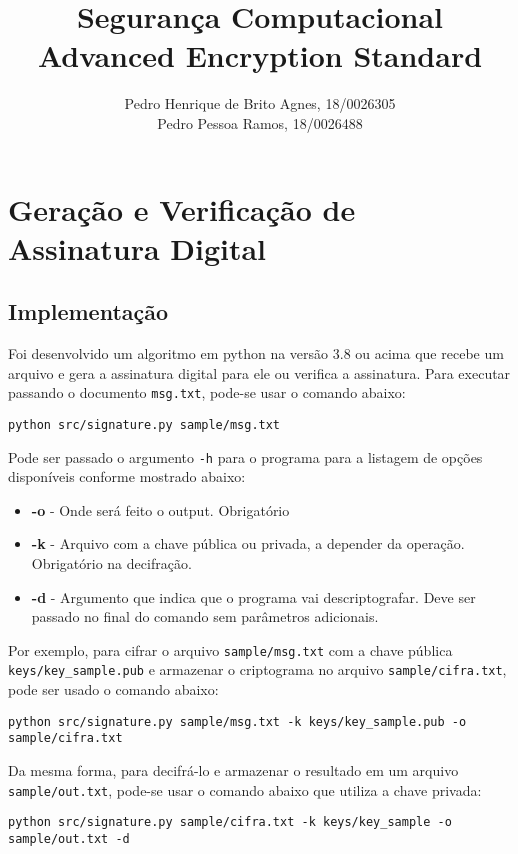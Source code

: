 \documentclass[12pt]{article}
\title{\textbf{Segurança Computacional\\ \Large{Advanced Encryption Standard}}}
\author{Pedro Henrique de Brito Agnes, 18/0026305
\\ Pedro Pessoa Ramos, 18/0026488
}
\affil{Dep. Ciência da Computação - Universidade de Brasília (UnB) \vspace{-2ex}}
\date{}
\begin{document}
\maketitle

\section{Geração e Verificação de Assinatura Digital}

\subsection{Implementação}
Foi desenvolvido um algoritmo em python na versão 3.8 ou acima que recebe um arquivo e gera a assinatura digital para ele ou verifica a assinatura. Para executar passando o documento \texttt{msg.txt}, pode-se usar o comando abaixo:

\begin{lstlisting}
python src/signature.py sample/msg.txt
\end{lstlisting}

Pode ser passado o argumento \texttt{-h} para o programa para a listagem de opções disponíveis conforme mostrado abaixo:

\begin{itemize}
    \item \textbf{-o} - Onde será feito o output. Obrigatório
    \item \textbf{-k} - Arquivo com a chave pública ou privada, a depender da operação. Obrigatório na decifração.
    \item \textbf{-d} - Argumento que indica que o programa vai descriptografar. Deve ser passado no final do comando sem parâmetros adicionais.
\end{itemize}

Por exemplo, para cifrar o arquivo \texttt{sample/msg.txt} com a chave pública \texttt{keys/key\_sample.pub} e armazenar o criptograma no arquivo \texttt{sample/cifra.txt}, pode ser usado o comando abaixo:

\begin{lstlisting}
python src/signature.py sample/msg.txt -k keys/key_sample.pub -o sample/cifra.txt
\end{lstlisting}

Da mesma forma, para decifrá-lo e armazenar o resultado em um arquivo \texttt{sample/out.txt}, pode-se usar o comando abaixo que utiliza a chave privada:

\begin{lstlisting}
python src/signature.py sample/cifra.txt -k keys/key_sample -o sample/out.txt -d
\end{lstlisting}
\end{document}
